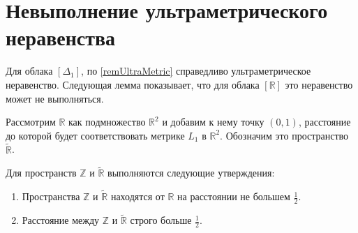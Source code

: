 
\section{Невыполнение ультраметрического неравенства}
Для облака $[\Delta_{1}]$, по \ref{remUltraMetric} справедливо
ультраметрическое неравенство.
 Следующая лемма показывает, что для облака $[\mathbb{R}]$
это неравенство может не выполняться.

Рассмотрим $\mathbb{R}$ как подмножество
$\mathbb{R}^2$ и добавим к нему точку $(0,1)$, расстояние до которой будет
соответствовать метрике $L_{1}$ в $\mathbb{R}^2$. Обозначим это
пространство $\widetilde{\mathbb{R}}$.
\begin{theorem}
Для пространств $\mathbb{Z}$ и $\widetilde{\mathbb{R}}$ выполняются следующие
утверждения:
\begin{enumerate}
  \item Пространства $\mathbb{Z}$ и $\widetilde{\mathbb{R}}$ находятся от $\mathbb{R}$
на расстоянии не большем $\frac 1 2$.\label{thrmPt:1}
  \item Расстояние между $\mathbb{Z}$ и $\widetilde{\mathbb{R}}$ строго
больше $\frac 1 2$.\label{thrmPt:2}
\end{enumerate}
\label{thrmRUltraMetric}
\end{theorem}
